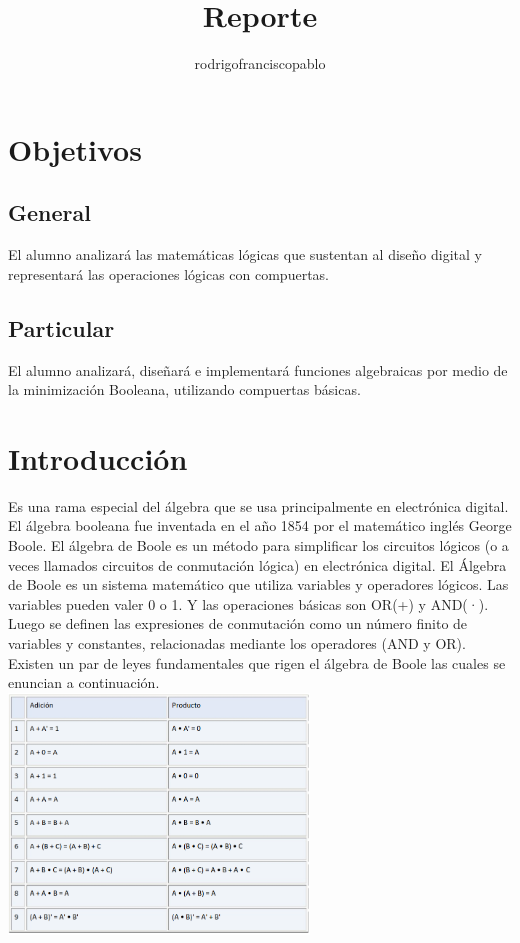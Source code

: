 \documentclass{mylib/reporteConCalif}
\title{Reporte}
\author{rodrigofranciscopablo }
\begin{document}
\coverPage

\tableofcontents
\newpage

\section{Objetivos}

\subsection{General}

El alumno analizará las matemáticas lógicas que sustentan al diseño digital y representará las operaciones lógicas con compuertas.

\subsection{Particular}

El alumno analizará, diseñará e implementará funciones algebraicas por medio de la minimización Booleana, utilizando compuertas básicas.

\section{Introducción}

Es una rama especial del álgebra que se usa principalmente en electrónica digital. El álgebra booleana fue inventada en el año 1854 por el matemático inglés George Boole.
El álgebra de Boole es un método para simplificar los circuitos lógicos (o a veces llamados circuitos de conmutación lógica) en electrónica digital.
El Álgebra de Boole es un sistema matemático que utiliza variables y operadores lógicos. Las variables pueden valer 0 o 1. Y las operaciones básicas son OR(+) y AND(·). Luego se definen las expresiones de conmutación como un número finito de variables y constantes, relacionadas mediante los operadores (AND y OR).
Existen un par de leyes fundamentales que rigen el álgebra de Boole las cuales se enuncian a continuación.\\

\includegraphics[width=8cm]{img/labdise_practica3/image9}
\end{document}
